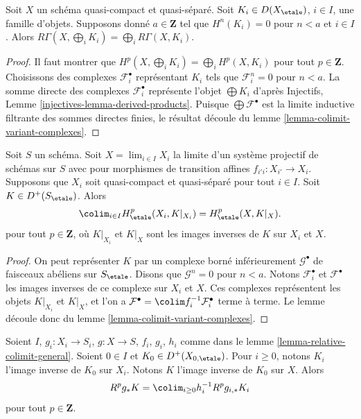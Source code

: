 \begin{lemma}
\label{lemma-direct-sum-bounded-below-cohomology}
Soit $X$ un sch\'ema quasi-compact et quasi-s\'epar\'e. Soit
$K_i \in D(X_\etale)$, $i \in I$, une famille d'objets.
Supposons donn\'e $a \in \mathbf{Z}$ tel que $H^n(K_i) = 0$ pour $n < a$
et $i \in I$. Alors $R\Gamma(X, \bigoplus_i K_i) =
\bigoplus_i R\Gamma(X, K_i)$.
\end{lemma}

\begin{proof}
Il faut montrer que $H^p(X, \bigoplus_i K_i) =
\bigoplus_i H^p(X, K_i)$ pour tout $p \in \mathbf{Z}$.
Choisissons des complexes $\mathcal{F}_i^\bullet$ repr\'esentant $K_i$
tels que $\mathcal{F}_i^n = 0$ pour $n < a$.
La somme directe des complexes $\mathcal{F}_i^\bullet$
repr\'esente l'objet $\bigoplus K_i$ d'apr\`es
Injectifs, Lemme \ref{injectives-lemma-derived-products}.
Puisque $\bigoplus \mathcal{F}^\bullet$ est la limite inductive filtrante
des sommes directes finies, le r\'esultat d\'ecoule
du lemme \ref{lemma-colimit-variant-complexes}.
\end{proof}

\begin{lemma}
\label{lemma-colimit-complexes}
Soit $S$ un sch\'ema. Soit $X = \lim_{i \in I} X_i$ la limite d'un
syst\`eme projectif de sch\'emas sur $S$ avec pour morphismes de transition affines
$f_{i'i} : X_{i'} \to X_i$. Supposons que $X_i$ soit quasi-compact et
quasi-s\'epar\'e pour tout $i \in I$. Soit $K \in D^+(S_\etale)$. Alors
$$
\colim_{i \in I} H_\etale^p(X_i, K|_{X_i}) = H_\etale^p(X, K|_X).
$$
pour tout $p \in \mathbf{Z}$, o\`u $K|_{X_i}$ et $K|_X$
sont les images inverses de $K$ sur $X_i$ et $X$.
\end{lemma}

\begin{proof}
On peut repr\'esenter $K$ par un complexe born\'e inf\'erieurement $\mathcal{G}^\bullet$
de faisceaux ab\'eliens sur $S_\etale$. Disons que $\mathcal{G}^n = 0$ pour $n < a$.
Notons $\mathcal{F}^\bullet_i$ et $\mathcal{F}^\bullet$ les images inverses
de ce complexe sur $X_i$ et $X$. Ces complexes repr\'esentent les
objets $K|_{X_i}$ et $K|_X$, et l'on a
$\mathcal{F}^\bullet = \colim f_i^{-1}\mathcal{F}_i^\bullet$
terme \`a terme. Le lemme d\'ecoule donc du
lemme \ref{lemma-colimit-variant-complexes}.
\end{proof}

\begin{lemma}
\label{lemma-relative-colimit-general-complexes}
Soient $I$, $g_i : X_i \to S_i$, $g : X \to S$, $f_i$, $g_i$, $h_i$ comme dans le
lemme \ref{lemma-relative-colimit-general}.
Soient $0 \in I$ et $K_0 \in D^+(X_{0, \etale})$.
Pour $i \geq 0$, notons $K_i$ l'image inverse de $K_0$ sur $X_i$.
Notons $K$ l'image inverse de $K_0$ sur $X$. Alors
$$
R^pg_*K = \colim_{i \geq 0} h_i^{-1}R^pg_{i, *}K_i
$$
pour tout $p \in \mathbf{Z}$.
\end{lemma}

